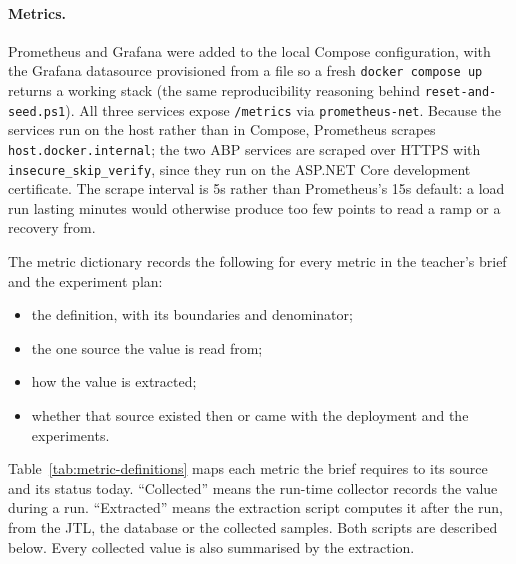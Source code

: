 \documentclass[a4paper]{report}
\begin{document}
\paragraph{Metrics.} Prometheus and Grafana were added to the local Compose
configuration, with the Grafana datasource provisioned
from a file so a fresh \texttt{docker compose up} returns a working stack
(the same reproducibility reasoning behind \texttt{reset-and-seed.ps1}). All
three services expose \texttt{/metrics} via \texttt{prometheus-net}. Because
the services run on the host rather than in Compose, Prometheus scrapes
\texttt{host.docker.internal}; the two ABP services are scraped over HTTPS
with \texttt{insecure\_skip\_verify}, since they run on the ASP.NET Core
development certificate. The scrape interval is 5s rather than Prometheus's
15s default: a load run lasting minutes would otherwise produce too few
points to read a ramp or a recovery from.

The metric dictionary records the following for every metric in the
teacher's brief and the experiment plan:
\begin{itemize}
  \item the definition, with its boundaries and denominator;
  \item the one source the value is read from;
  \item how the value is extracted;
  \item whether that source existed then or came with the deployment and the experiments.
\end{itemize}
Table~\ref{tab:metric-definitions} maps each metric the brief requires to its
source and its status today. ``Collected'' means the run-time collector
records the value during a run. ``Extracted'' means the extraction script
computes it after the run, from the JTL, the database or the collected
samples. Both scripts are described below. Every collected value is also
summarised by the extraction.
\end{document}

